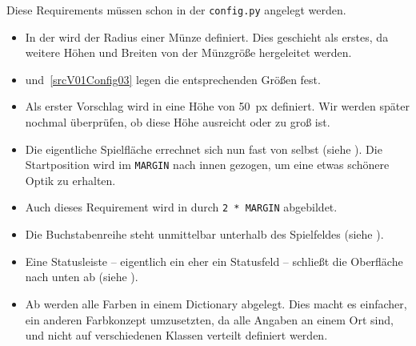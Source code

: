Diese Requirements müssen schon in der \texttt{config.py} angelegt werden. 

\begin{itemize}
	\item[Req. \ref{reqFourConnectScreen}.\ref{reqFourConnectScreen02}] In der  wird der Radius einer Münze definiert. Dies geschieht als erstes, da weitere Höhen und Breiten von der Münzgröße hergeleitet werden.

	\item[Req. \ref{reqFourConnectScreen}.\ref{reqFourConnectScreen03}]  und~\ref{srcV01Config03} legen die entsprechenden Größen fest.

	\item[Req. \ref{reqFourConnectScreen}.\ref{reqFourConnectScreen01}] Als erster Vorschlag wird in  eine Höhe von \SI{50}{px} definiert. Wir werden später nochmal überprüfen, ob diese Höhe ausreicht oder zu groß ist.

	\item[Req. \ref{reqFourConnectScreen}.\ref{reqFourConnectScreen04}] Die eigentliche Spielfläche errechnet sich nun fast von selbst (siehe ). Die Startposition wird im \texttt{MARGIN} nach innen gezogen, um eine etwas schönere Optik zu erhalten. 
	
	\item[Req. \ref{reqFourConnectScreen}.\ref{reqFourConnectScreen05}] Auch dieses Requirement wird in  durch \verb+2 * MARGIN+ abgebildet.  

	\item[Req. \ref{reqFourConnectScreen}.\ref{reqFourConnectScreen06}] Die Buchstabenreihe steht unmittelbar unterhalb des Spielfeldes (siehe ).  
	
	\item[Req. \ref{reqFourConnectScreen}.\ref{reqFourConnectScreen07}] Eine Statusleiste -- eigentlich ein eher ein Statusfeld -- schließt die Oberfläche nach unten ab (siehe ).  
	
	\item[Req. \ref{reqFourConnectScreen}.\ref{reqFourConnectScreen08}] Ab  werden alle Farben in einem Dictionary abgelegt. Dies macht es einfacher, ein anderen Farbkonzept umzusetzten, da alle Angaben an einem Ort sind, und nicht auf verschiedenen Klassen verteilt definiert werden.
\end{itemize}

